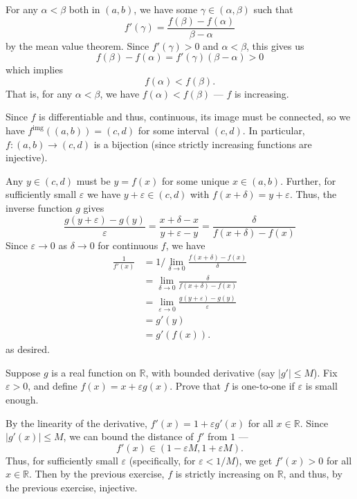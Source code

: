 \documentclass[12 pt, letterpaper]{hmcpset}
\begin{document}
\begin{solution}
	For any $\alpha < \beta$ both in $(a, b)$, we have some $\gamma \in (\alpha, \beta)$ such that
	\[
		f'(\gamma) = \frac{f(\beta) - f(\alpha)}{\beta - \alpha}
	\]
	by the mean value theorem. Since $f'(\gamma) > 0$ and $\alpha < \beta$, this gives us
	\[
		f(\beta) - f(\alpha) = f'(\gamma) (\beta - \alpha) > 0
	\]
	which implies
	\[
		f(\alpha) < f(\beta).
	\]
	That is, for any $\alpha < \beta$, we have $f(\alpha) < f(\beta)$ --- $f$ is increasing.

		Since $f$ is differentiable and thus, continuous, its image must be connected, so we have $f^{\text{img}}((a, b)) = (c, d)$ for some interval $(c, d)$. In particular, $f : (a, b) \to (c, d)$ is a bijection (since strictly increasing functions are injective). 

		Any $y \in (c, d)$ must be $y = f(x)$ for some unique $x \in (a, b)$. Further, for sufficiently small $\varepsilon$ we have $y + \varepsilon \in (c, d)$ with $f(x + \delta) = y + \varepsilon$. Thus, the inverse function $g$ gives
		\[
			\frac{g(y + \varepsilon) - g(y)}{\varepsilon} = \frac{x + \delta - x}{y + \varepsilon - y} = \frac{\delta}{f(x + \delta) - f(x)}
		\]
		Since $\varepsilon \to 0$ as $\delta \to 0$ for continuous $f$, we have
		\begin{align*}
			\frac{1}{f'(x)} & = 1 / \lim_{\delta \to 0} \frac{f(x + \delta) - f(x)}{\delta} \\
					& = \lim_{\delta \to 0} \frac{\delta}{f(x + \delta) - f(x)} \\
					& = \lim_{\varepsilon \to 0} \frac{g(y + \varepsilon) - g(y)}{\varepsilon} \\
					& = g'(y) \\
					& = g'(f(x)).
		\end{align*}
		as desired.
\end{solution}

\pagebreak

\begin{problem}
	Suppose $g$ is a real function on $\mathbb{R}$, with bounded derivative (say $\lvert g' \rvert \le M$). Fix $\varepsilon > 0$, and define $f(x) = x + \varepsilon g(x)$. Prove that $f$ is one-to-one if $\varepsilon$ is small enough.
\end{problem}

\begin{solution}
	By the linearity of the derivative, $f'(x) = 1 + \varepsilon g'(x)$ for all $x \in \mathbb{R}$. Since $\lvert g'(x) \rvert \le M$, we can bound the distance of $f'$ from $1$ --- 
	\[
		f'(x) \in (1 - \varepsilon M, 1 + \varepsilon M).
	\]
	Thus, for sufficiently small $\varepsilon$ (specifically, for $\varepsilon < 1 / M$), we get $f'(x) > 0$ for all $x \in \mathbb{R}$. Then by the previous exercise, $f$ is strictly increasing on $\mathbb{R}$, and thus, by the previous exercise, injective.
\end{solution}
\end{document}
